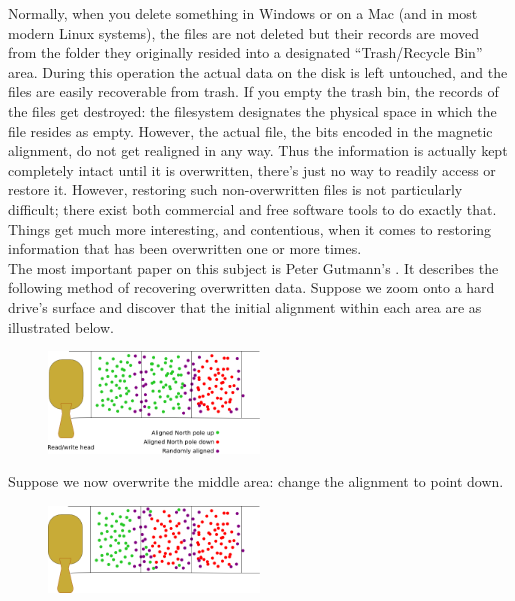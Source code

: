 Normally, when you delete something in Windows or on a Mac (and in most modern Linux systems), the files are not deleted but their records are moved from the folder they originally resided into a designated ``Trash/Recycle Bin'' area. During this operation the actual data on the disk is left untouched, and the files are easily recoverable from trash. If you empty the trash bin, the records of the files get destroyed: the filesystem designates the physical space in which the file resides as empty. However, the actual file, the bits encoded in the magnetic alignment, do not get realigned in any way. Thus the information is actually kept completely intact until it is overwritten, there's just no way to readily access or restore it. However, restoring such non-overwritten files is not particularly difficult; there exist both commercial and free software tools to do exactly that. Things get much more interesting, and contentious, when it comes to restoring information that has been overwritten one or more times. \\

The most important paper on this subject is Peter Gutmann's . It describes the following method of recovering overwritten data. Suppose we zoom onto a hard drive's surface and discover that the initial alignment within each area are as illustrated below. \\

	\begin{figure}[H]
	   \centering
	   \includegraphics[width=0.5\textwidth]{season1/111/images/111(3).png} 
	\end{figure}

Suppose we now overwrite the middle area: change the alignment to point down. \\

	\begin{figure}[H]
	   \centering
	   \includegraphics[width=0.5\textwidth]{season1/111/images/111(4).png} 
	\end{figure}

